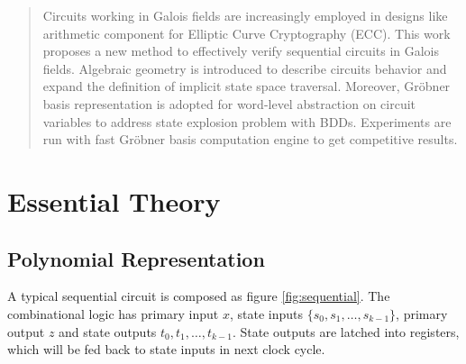 \documentclass{acm_proc_article-sp}
\begin{document}
\date{21 Jan 2014}

\maketitle
\begin{abstract}
Circuits working in Galois fields are increasingly employed in designs like arithmetic component for Elliptic Curve Cryptography (ECC). 
This work proposes a new method to effectively verify sequential circuits in Galois fields. Algebraic geometry
is introduced to describe circuits behavior and expand the definition of implicit state space traversal. Moreover, Gr\"obner basis
representation is adopted for word-level abstraction on circuit variables to address state explosion problem
with BDDs. Experiments are run with fast Gr\"obner basis computation engine to get competitive results.
\end{abstract}




\section{Essential Theory}
\subsection{Polynomial Representation}
A typical sequential circuit is composed as figure \ref{fig:sequential}. The combinational logic has primary input $x$, state
inputs $\{s_0, s_1, \dots, s_{k-1}\}$, primary output $z$ and state outputs $t_0, t_1, \dots, t_{k-1}$. State outputs
are latched into registers, which will be fed back to state inputs in next clock cycle.
\end{document}
